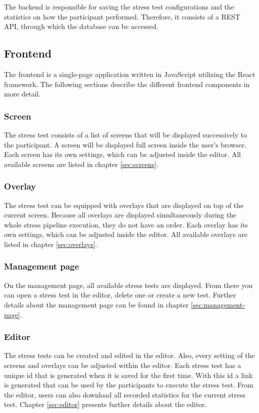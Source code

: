 The backend is responsible for saving the stress test configurations and the statistics on how the participant performed.
Therefore, it consists of a REST API, through which the database can be accessed.

\subsection{Frontend}
The frontend is a single-page application written in JavaScript utilizing the React framework. 
The following sections describe the different frontend components in more detail.

\subsubsection*{Screen}
The stress test consists of a list of screens that will be displayed successively to the participant. 
A screen will be displayed full screen inside the user's browser. 
Each screen has its own settings, which can be adjusted inside the editor. 
All available screens are listed in chapter \ref{sec:screens}.

\subsubsection*{Overlay}
The stress test can be equipped with overlays that are displayed on top of the current screen. 
Because all overlays are displayed simultaneously during the whole stress pipeline execution, they do not have an order. 
Each overlay has its own settings, which can be adjusted inside the editor.
All available overlays are listed in chapter \ref{sec:overlays}.

\subsubsection*{Management page}
On the management page, all available stress tests are displayed.
From there you can open a stress test in the editor, delete one or create a new test.
Further details about the management page can be found in chapter \ref{sec:management-page}.

\subsubsection*{Editor}
The stress tests can be created and edited in the editor.
Also, every setting of the screens and overlays can be adjusted within the editor.
Each stress test has a unique id that is generated when it is saved for the first time.
With this id a link is generated that can be used by the participants to execute the stress test.
From the editor, users can also download all recorded statistics for the current stress test.
Chapter \ref{sec:editor} presents further details about the editor.

